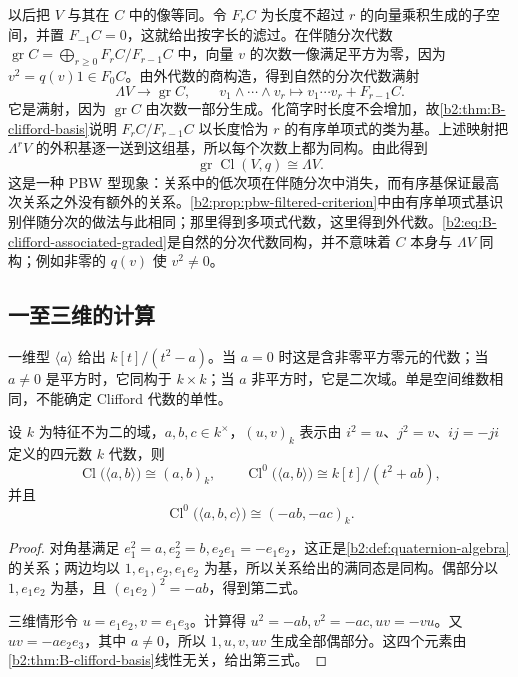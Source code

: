 以后把 \(V\) 与其在 \(C\) 中的像等同。令 \(F_rC\) 为长度不超过 \(r\) 的向量乘积生成的子空间，并置 \(F_{-1}C=0\)，这就给出按字长的滤过。在伴随分次代数 \(\operatorname{gr}C=\bigoplus_{r\ge0}F_rC/F_{r-1}C\) 中，向量 \(v\) 的次数一像满足平方为零，因为 \(v^2=q(v)1\in F_0C\)。由外代数的商构造，得到自然的分次代数满射
\[
	\Lambda V\longrightarrow\operatorname{gr}C, \qquad v_1\wedge\cdots\wedge v_r\longmapsto v_1\cdots v_r+F_{r-1}C.
\]
它是满射，因为 \(\operatorname{gr}C\) 由次数一部分生成。化简字时长度不会增加，故\cref{b2:thm:B-clifford-basis}说明 \(F_rC/F_{r-1}C\) 以长度恰为 \(r\) 的有序单项式的类为基。上述映射把 \(\Lambda^rV\) 的外积基逐一送到这组基，所以每个次数上都为同构。由此得到
\begin{equation}\label{b2:eq:B-clifford-associated-graded}
	\operatorname{gr}\operatorname{Cl}(V,q)\cong\Lambda V.
\end{equation}
这是一种 PBW 型现象：关系中的低次项在伴随分次中消失，而有序基保证最高次关系之外没有额外的关系。\cref{b2:prop:pbw-filtered-criterion}中由有序单项式基识别伴随分次的做法与此相同；那里得到多项式代数，这里得到外代数。\eqref{b2:eq:B-clifford-associated-graded}是自然的分次代数同构，并不意味着 \(C\) 本身与 \(\Lambda V\) 同构；例如非零的 \(q(v)\) 使 \(v^2\ne0\)。

\subsection{一至三维的计算}
\label{b2:subsec:B01:03}

一维型 \(\langle a\rangle\) 给出 \(k[t]/(t^2-a)\)。当 \(a=0\) 时这是含非零平方零元的代数；当 \(a\ne0\) 是平方时，它同构于 \(k\times k\)；当 \(a\) 非平方时，它是二次域。单是空间维数相同，不能确定 Clifford 代数的单性。

\begin{proposition}\label{b2:prop:B-low-clifford}
	设 \(k\) 为特征不为二的域，\(a,b,c\in k^\times\)，\((u,v)_k\) 表示由 \(i^2=u\)、\(j^2=v\)、\(ij=-ji\) 定义的四元数 \(k\) 代数，则
	\[
		\operatorname{Cl}\bigl(\langle a,b\rangle\bigr)\cong(a,b)_k, \qquad \operatorname{Cl}^0\bigl(\langle a,b\rangle\bigr) \cong k[t]/(t^2+ab),
	\]
	并且
	\[
		\operatorname{Cl}^0\bigl(\langle a,b,c\rangle\bigr) \cong(-ab,-ac)_k.
	\]
\end{proposition}
\begin{proof}
	对角基满足 \(e_1^2=a,e_2^2=b,e_2e_1=-e_1e_2\)，这正是\cref{b2:def:quaternion-algebra}的关系；两边均以 \(1,e_1,e_2,e_1e_2\) 为基，所以关系给出的满同态是同构。偶部分以 \(1,e_1e_2\) 为基，且 \((e_1e_2)^2=-ab\)，得到第二式。

	三维情形令 \(u=e_1e_2,v=e_1e_3\)。计算得 \(u^2=-ab,v^2=-ac,uv=-vu\)。又 \(uv=-a e_2e_3\)，其中 \(a\ne0\)，所以 \(1,u,v,uv\) 生成全部偶部分。这四个元素由\cref{b2:thm:B-clifford-basis}线性无关，给出第三式。
\end{proof}

